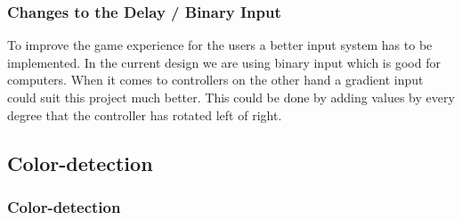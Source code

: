 \subsubsection*{Changes to the Delay / Binary Input}
To improve the game experience for the users a better input system has to be implemented. In the current design we are using binary input which is good for computers. When it comes to controllers on the other hand a gradient input could suit this project much better. This could be done by adding values by every degree that the controller has rotated left of right.

\subsection{Color-detection}

\subsubsection*{Color-detection}

